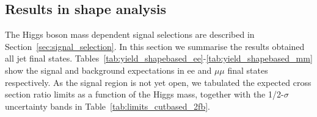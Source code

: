 \subsection{Results in shape analysis} 

The Higgs boson mass dependent signal selections are described in Section~\ref{sec:signal_selection}. 
In this section we summarise the results obtained all jet final states. 
Tables~\ref{tab:yield_shapebased_ee}-\ref{tab:yield_shapebased_mm} show the signal %
and background expectations in ee and $\mu\mu$ final states respectively. 
As the signal region is not yet open, we tabulated the expected cross section ratio limits as a function 
of the Higgs mass, together with the 1/2-$\sigma$ uncertainty bands in Table~\ref{tab:limits_cutbased_2fb}.


